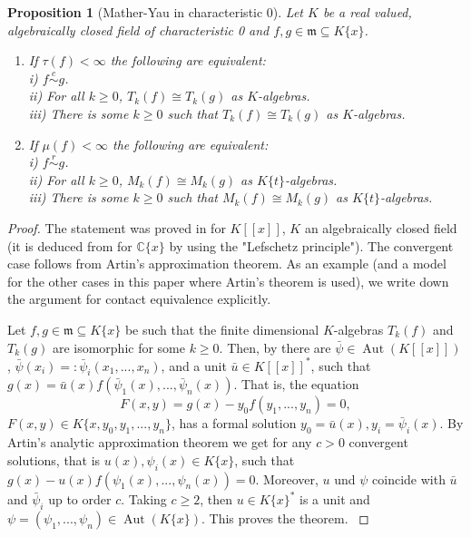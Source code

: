 \documentclass[11pt]{article}
\DeclareMathOperator{\Aut}{Aut}
\newtheorem{Proposition}[Definition]{Proposition }
\newcommand{\C}{{\mathbb C}}
\begin{document}
\begin{Proposition}[Mather-Yau in characteristic 0]
\label{prop.MY0}
Let $K$ be a real valued, algebraically closed field of characteristic 0 and $f, g \in\mathfrak{m}\subseteq K\{x\}$. 
\begin{enumerate}
\item  If $\tau(f)<\infty$ the following are equivalent:\\
i) $f\mathop  \sim \limits^c g$.\\
ii)  For all $k\ge 0$, $T_k(f)\cong T_k(g)$ as $K$-algebras.\\
iii) There is some $k\ge 0$ such that  $T_k(f)\cong T_k(g)$ as $K$-algebras.
\item If $\mu(f)<\infty$ the following are equivalent:\\
i) $f\mathop  \sim \limits^r g$.\\
ii) For all $k\ge 0$, $M_k(f)\cong M_k(g)$ as $K\{t\}$-algebras.\\
iii) There is some $k\ge 0$ such that  $M_k(f)\cong M_k(g)$ as $K\{t\}$-algebras.
\end{enumerate}
\end{Proposition}

\begin{proof}
 {The statement was proved in \cite[Proposition 2.1]{GPh} for $K[[x]]$, $K$ an algebraically closed field  (it is deduced  from  \cite[Theorem 1.2.26]{GLS25} for $\C\{x\}$ by using the "Lefschetz principle"). 
The convergent case follows from Artin's approximation theorem. As an example (and a model for the other cases in this paper where Artin's theorem is used), we write down the argument for contact equivalence explicitly.}

 {
Let $f, g\in \mathfrak{m}\subseteq K\{{x}\}$ be such that the finite dimensional $K$-algebras $T_k(f)$ and $T_k(g)$ are isomorphic for some $k\ge 0$. Then, by \cite[Proposition 2.1]{GPh} there are $\bar\psi\in \Aut(K[[x]])$, $\bar\psi(x_i) = :\bar\psi_i(x_1,...,x_n)$,  and a unit $\bar u\in K[[x]]^{\ast}$, 
 such that 
$ g(x) = \bar u(x) f(\bar\psi_1(x),...,\bar\psi_n(x)).$  
That is, the  equation 
$$F(x,y) = g(x)-y_0 f(y_1,...,y_n)=0,$$
$F(x,y) \in K\{x,y_0,y_1,...,y_n\}$,
has a formal solution $y_0=\bar u(x), y_i = \bar\psi_i(x)$. By Artin's analytic approximation  theorem \cite {Ar68} we get  for any $c>0$ convergent solutions, that is  $u(x), \psi_i(x) \in K\{x\}$, such that $ g(x) -  u(x) f(\psi_1(x),...,\psi_n(x)) =0$. Moreover,  
$u$ und $\psi$ coincide with $\bar u$ and $\bar \psi_i$ up to order $c$. Taking $c\ge 2$, then $u\in K\{x\}^\ast$  is a unit and
$\psi = (\psi_1,...,\psi_n) \in \Aut(K\{x\})$. This proves the theorem.
}
\end{proof}
\end{document}
